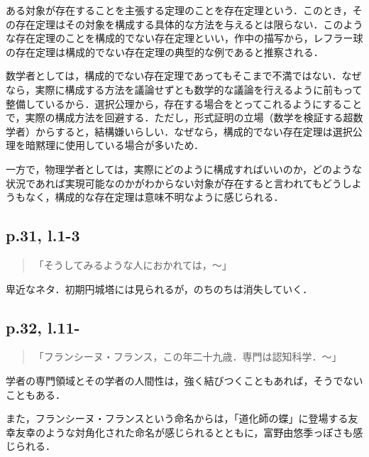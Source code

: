 \documentclass[10pt, a5paper, twoside]{jsarticle}
\theoremstyle{definition}
\begin{document}
                ある対象が存在することを主張する定理のことを存在定理という．このとき，その存在定理はその対象を構成する具体的な方法を与えるとは限らない．このような存在定理のことを構成的でない存在定理といい，作中の描写から，レフラー球の存在定理は構成的でない存在定理の典型的な例であると推察される．

                数学者としては，構成的でない存在定理であってもそこまで不満ではない．なぜなら，実際に構成する方法を議論せずとも数学的な議論を行えるように前もって整備しているから．選択公理から，存在する場合をとってこれるようにすることで，実際の構成方法を回避する．ただし，形式証明の立場（数学を検証する超数学者）からすると，結構嫌いらしい．なぜなら，構成的でない存在定理は選択公理を暗黙理に使用している場合が多いため．

                一方で，物理学者としては，実際にどのように構成すればいいのか，どのような状況であれば実現可能なのかがわからない対象が存在すると言われてもどうしようもなく，構成的な存在定理は意味不明なように感じられる．

            \subsection{p.31, l.1-3}

                \begin{quote}

                    「そうしてみるような人におかれては，〜」

                \end{quote}

                卑近なネタ．初期円城塔には見られるが，のちのちは消失していく．

            \subsection{p.32, l.11-}

                \begin{quote}

                    「フランシーヌ・フランス，この年二十九歳．専門は認知科学．〜」

                \end{quote}

                学者の専門領域とその学者の人間性は，強く結びつくこともあれば，そうでないこともある．

                また，フランシーヌ・フランスという命名からは，「道化師の蝶」に登場する友幸友幸のような対角化された命名が感じられるとともに，富野由悠季っぽさも感じられる．
\end{document}
